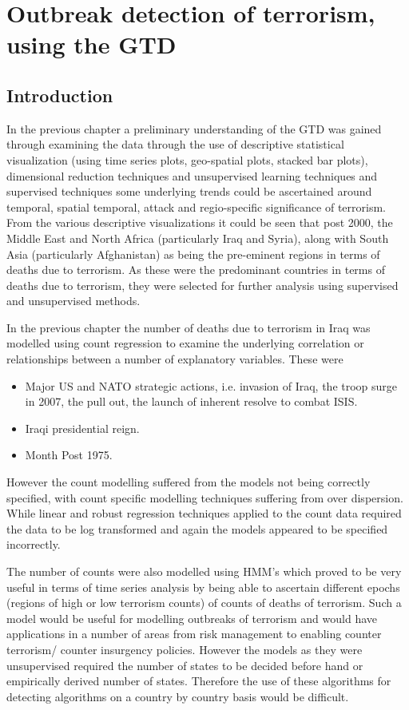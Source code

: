 \chapter[A Preliminary understanding of the global terrorism database]{Outbreak detection of terrorism, using the GTD}

\section{Introduction}

In the previous chapter a preliminary understanding of the GTD was gained through examining the data through the use of descriptive statistical visualization (using time series plots, geo-spatial plots, stacked bar plots), dimensional reduction techniques and unsupervised learning techniques and supervised techniques some underlying trends could be ascertained around temporal, spatial temporal, attack and regio-specific significance of terrorism. From the various descriptive visualizations it could be seen that post 2000, the Middle East and North Africa (particularly Iraq and Syria), along with South Asia (particularly Afghanistan) as being the pre-eminent regions in terms of deaths due to terrorism. As these were the predominant countries in terms of deaths due to terrorism, they were selected for further analysis using supervised and unsupervised methods.

In the previous chapter the number of deaths due to terrorism in Iraq was modelled using count regression to examine the underlying correlation or relationships between a number of explanatory variables. These were 
\begin{itemize}
\item Major US and NATO strategic actions, i.e. invasion of Iraq, the troop surge in 2007, the pull out, the launch of inherent resolve to combat ISIS.
\item Iraqi presidential reign.
\item Month Post 1975.
\end{itemize}

However the count modelling suffered from the models not being correctly specified, with count specific modelling techniques suffering from over dispersion. While linear and robust regression techniques applied to the count data required the data to be log transformed and again the models appeared to be specified incorrectly.   

The number of counts were also modelled using HMM's which proved to be very useful in terms of time series analysis by being able to ascertain different epochs (regions of high or low terrorism counts) of counts of deaths of terrorism. Such a model would be useful for modelling outbreaks of terrorism and would have applications in a number of areas from risk management to enabling counter terrorism/ counter insurgency policies. However the models as they were unsupervised required the number of states to be decided before hand or empirically derived number of states. Therefore the use of these algorithms for detecting algorithms on a country by country basis would be difficult.

